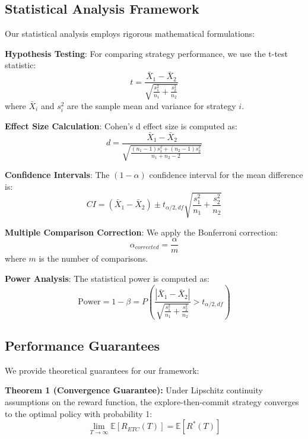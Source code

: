 \documentclass[letterpaper]{article} %
\begin{document}
\subsection{Statistical Analysis Framework}

Our statistical analysis employs rigorous mathematical formulations:

\textbf{Hypothesis Testing}: For comparing strategy performance, we use the t-test statistic:
\begin{equation}
t = \frac{\bar{X}_1 - \bar{X}_2}{\sqrt{\frac{s_1^2}{n_1} + \frac{s_2^2}{n_2}}}
\end{equation}
where $\bar{X}_i$ and $s_i^2$ are the sample mean and variance for strategy $i$.

\textbf{Effect Size Calculation}: Cohen's d effect size is computed as:
\begin{equation}
d = \frac{\bar{X}_1 - \bar{X}_2}{\sqrt{\frac{(n_1-1)s_1^2 + (n_2-1)s_2^2}{n_1 + n_2 - 2}}}
\end{equation}

\textbf{Confidence Intervals}: The $(1-\alpha)$ confidence interval for the mean difference is:
\begin{equation}
CI = (\bar{X}_1 - \bar{X}_2) \pm t_{\alpha/2, df} \sqrt{\frac{s_1^2}{n_1} + \frac{s_2^2}{n_2}}
\end{equation}

\textbf{Multiple Comparison Correction}: We apply the Bonferroni correction:
\begin{equation}
\alpha_{corrected} = \frac{\alpha}{m}
\end{equation}
where $m$ is the number of comparisons.

\textbf{Power Analysis}: The statistical power is computed as:
\begin{equation}
\text{Power} = 1 - \beta = P\left(\frac{|\bar{X}_1 - \bar{X}_2|}{\sqrt{\frac{s_1^2}{n_1} + \frac{s_2^2}{n_2}}} > t_{\alpha/2, df} \right)
\end{equation}

\subsection{Performance Guarantees}

We provide theoretical guarantees for our framework:

\textbf{Theorem 1 (Convergence Guarantee):} Under Lipschitz continuity assumptions on the reward function, the explore-then-commit strategy converges to the optimal policy with probability 1:
\begin{equation}
\lim_{T \rightarrow \infty} \mathbb{E}[R_{ETC}(T)] = \mathbb{E}[R^*(T)]
\end{equation}
\end{document}
